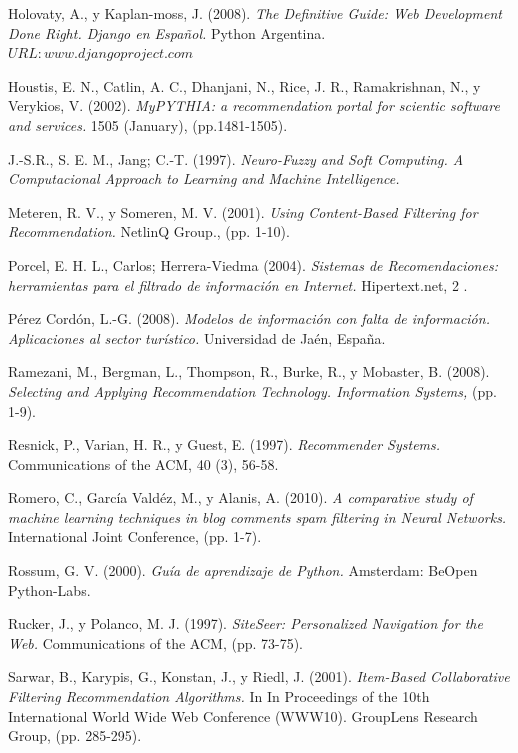 \documentclass[12pt,letterpaper,oneside] {memoir}
\begin{document}
\begin{thebibliography}{99}
 Holovaty, A., y Kaplan-moss, J. (2008).\textit{ The Definitive Guide: Web Development Done Right. Django en Español.} Python Argentina. $URL: www.djangoproject.com$

 Houstis, E. N., Catlin, A. C., Dhanjani, N., Rice, J. R., Ramakrishnan, N., y Verykios, V. (2002). \textit{MyPYTHIA: a recommendation portal for scientic software and services.} 1505 (January), (pp.1481-1505).

 J.-S.R., S. E. M., Jang; C.-T. (1997). \textit{Neuro-Fuzzy and Soft Computing. A Computacional Approach to Learning and Machine Intelligence.}

 Meteren, R. V., y Someren, M. V. (2001). \textit{Using Content-Based Filtering for Recommendation.} NetlinQ Group., (pp. 1-10).

 Porcel, E. H. L., Carlos; Herrera-Viedma (2004).\textit{ Sistemas de Recomendaciones: herramientas para el filtrado de información en Internet.} Hipertext.net, 2 .

 Pérez Cordón, L.-G. (2008). \textit{Modelos de información con falta de información. Aplicaciones al sector turístico.} Universidad de Jaén, España.

 Ramezani, M., Bergman, L., Thompson, R., Burke, R., y Mobaster, B. (2008). \textit{Selecting and Applying Recommendation Technology. Information Systems,} (pp. 1-9).

 Resnick, P., Varian, H. R., y Guest, E. (1997).\textit{ Recommender Systems.} Communications of the ACM, 40 (3), 56-58.

 Romero, C., García Valdéz, M., y Alanis, A. (2010). \textit{A comparative study of machine learning techniques in blog comments spam filtering in Neural Networks.}  International Joint Conference, (pp. 1-7).

 Rossum, G. V. (2000). \textit{Guía de aprendizaje de Python.} Amsterdam: BeOpen Python-Labs.

 Rucker, J., y Polanco, M. J. (1997). \textit{SiteSeer: Personalized Navigation for the Web.} Communications of the ACM, (pp. 73-75).

 Sarwar, B., Karypis, G., Konstan, J., y Riedl, J. (2001). \textit{Item-Based Collaborative Filtering Recommendation Algorithms.} In In Proceedings of the 10th International World Wide Web Conference (WWW10). GroupLens Research Group, (pp. 285-295).


\end{thebibliography}
\end{document}
